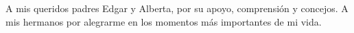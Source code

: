\begin{dedication}
    \hfill {\fontsize{8}{13}\selectfont A mis queridos padres Edgar y Alberta,  por  su apoyo, comprensión  y  concejos. A mis hermanos por alegrarme en los momentos más importantes de mi vida.}
\end{dedication}